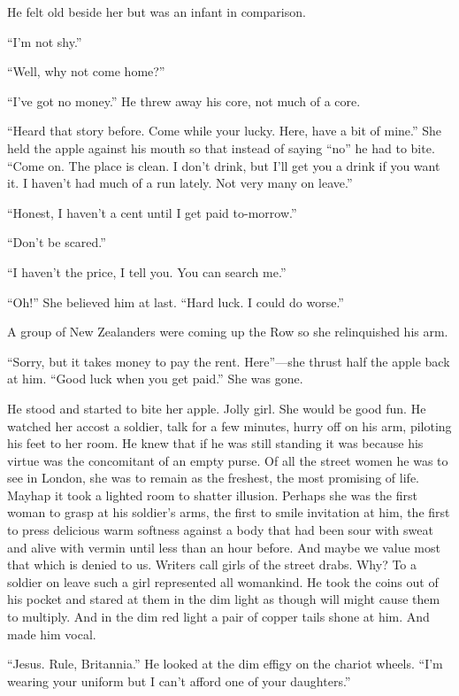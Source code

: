 He felt old beside her but was an infant in comparison.

``I'm not shy.''

``Well, why not come home?''

``I've got no money.'' He threw away his core, not much of a core.

``Heard that story before. Come while your lucky. Here, have a bit of mine.'' She held the apple against his mouth so that instead of saying ``no'' he had to bite. ``Come on. The place is clean. I don't drink, but I'll get you a drink if you want it. I haven't had much of a run lately. Not very many on leave.''

``Honest, I haven't a cent until I get paid to-morrow.''

``Don't be scared.''

``I haven't the price, I tell you. You can search me.''

``Oh!'' She believed him at last. ``Hard luck. I could do worse.''

A group of New Zealanders were coming up the Row so she relinquished his arm.

``Sorry, but it takes money to pay the rent. Here''---she thrust half the apple back at him. ``Good luck when you get paid.'' She was gone.

He stood and started to bite her apple. Jolly girl. She would be good fun. He watched her accost a soldier, talk for a few minutes, hurry off on his arm, piloting his feet to her room. He knew that if he was still standing it was because his virtue was the concomitant of an empty purse. Of all the street women he was to see in London, she was to remain as the freshest, the most promising of life. Mayhap it took a lighted room to shatter illusion. Perhaps she was the first woman to grasp at his soldier's arms, the first to smile invitation at him, the first to press delicious warm softness against a body that had been sour with sweat and alive with vermin until less than an hour before. And maybe we value most that which is denied to us. Writers call girls of the street drabs. Why? To a soldier on leave such a girl represented all womankind. He took the coins out of his pocket and stared at them in the dim light as though will might cause them to multiply. And in the dim red light a pair of copper tails shone at him. And made him vocal.

``Jesus. Rule, Britannia.'' He looked at the dim effigy on the chariot wheels. ``I'm wearing your uniform but I can't afford one of your daughters.''

